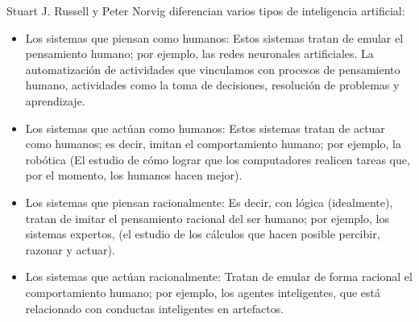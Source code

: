 Stuart J. Russell y Peter Norvig diferencian varios tipos de inteligencia artificial:
\begin{itemize}
\item Los sistemas que piensan como humanos: Estos sistemas tratan de emular el pensamiento humano; por ejemplo, las redes neuronales artificiales. La automatización de actividades que vinculamos con procesos de pensamiento humano, actividades como la toma de decisiones, resolución de problemas y aprendizaje.\cite{bellman1978artificial}
\item Los sistemas que actúan como humanos: Estos sistemas tratan de actuar como humanos; es decir, imitan el comportamiento humano; por ejemplo, la robótica (El estudio de cómo lograr que los computadores realicen tareas que, por el momento, los humanos hacen mejor).\cite{winston1992artificial}
\item Los sistemas que piensan racionalmente: Es decir, con lógica (idealmente), tratan de imitar el pensamiento racional del ser humano; por ejemplo, los sistemas expertos, (el estudio de los cálculos que hacen posible percibir, razonar y actuar).\cite{winston1992artificial}
\item Los sistemas que actúan racionalmente: Tratan de emular de forma racional el comportamiento humano; por ejemplo, los agentes inteligentes, que está relacionado con conductas inteligentes en artefactos.\cite{nilsson1998artificial}
\end{itemize}


